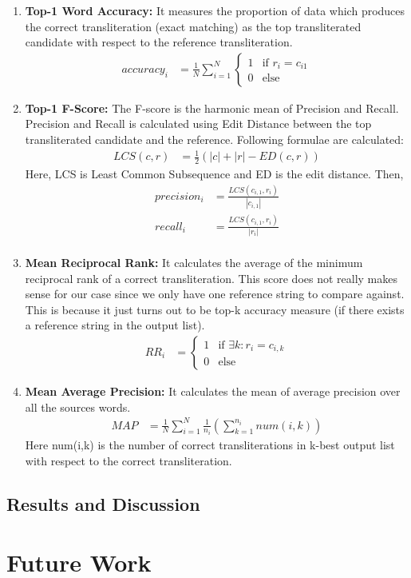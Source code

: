 \documentclass[11pt,a4paper]{article}
\begin{document}
\begin{enumerate}
\item \textbf{Top-1 Word Accuracy: } It measures the proportion of data which produces the correct transliteration (exact matching) as the top transliterated candidate with respect to the reference transliteration.
\begin{align*}
	accuracy_i & = \frac{1}{N}\sum_{i=1}^{N}
							\begin{cases}
								1 & \text{if }r_i = c_{i1}\\
								0 & \text{else}
							\end{cases}
\end{align*}
\item \textbf{Top-1 F-Score: } The F-score is the harmonic mean of Precision and Recall. Precision and Recall is calculated using Edit Distance between the top transliterated candidate and the reference. Following formulae are calculated:
\begin{align*}
	LCS(c,r) & = \frac{1}{2}(|c| + |r| - ED(c,r))
\end{align*}
Here, LCS is Least Common Subsequence and ED is the edit distance. Then,
\begin{align*}
	precision_i & = \frac{LCS(c_{i,1}, r_i)}{|c_{i,1}|} \\
	recall_i & = \frac{LCS(c_{i,1}, r_i)}{|r_{i}|} \\
\end{align*}

\item \textbf{Mean Reciprocal Rank: } It calculates the average of the minimum reciprocal rank of a correct transliteration. This score does not really makes sense for our case since we only have one reference string to compare against. This is because it just turns out to be top-k accuracy measure (if there exists a reference string in the output list).
\begin{align*}
	RR_i & = 
		\begin{cases}
			1 & \text{if }\exists k: r_i = c_{i,k} \\
			0 & \text{else}
		\end{cases}
\end{align*}
\item \textbf{Mean Average Precision: } It calculates the mean of average precision over  all the sources words.
\begin{align*}
	MAP & = \frac{1}{N} \sum_{i=1}^{N} \frac{1}{n_i} (\sum_{k=1}^{n_i}num(i,k))
\end{align*}
Here num(i,k) is the number of correct transliterations in k-best output list with respect to the correct transliteration.

\end{enumerate}
\subsection{Results and Discussion}

\section{Future Work}


\end{document}
